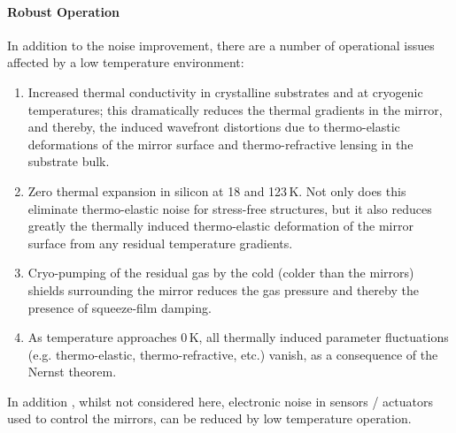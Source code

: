 \paragraph{Robust Operation}
In addition to the noise improvement, there are a number of operational issues affected by a low temperature environment:
\begin{enumerate}
\item Increased thermal conductivity in crystalline substrates and at cryogenic temperatures; this dramatically reduces the thermal gradients in the mirror, and thereby, the induced wavefront distortions due to thermo-elastic deformations of the mirror surface and thermo-refractive lensing in the substrate bulk.
\item Zero thermal expansion in silicon at 18 and 123\,K. Not only does this eliminate thermo-elastic noise for stress-free structures, but it also reduces greatly the thermally induced thermo-elastic deformation of the mirror surface from any residual temperature gradients.
\item Cryo-pumping of the residual gas by the cold (colder than the mirrors) shields surrounding the mirror reduces the gas pressure and thereby the presence of squeeze-film damping.


\item As temperature approaches 0\,K, all thermally induced parameter fluctuations (e.g. thermo-elastic, thermo-refractive, etc.) vanish, as a consequence of the Nernst theorem.
\end{enumerate}
In addition , whilst not considered here,   electronic noise in sensors / actuators used to control the mirrors, can be reduced by low temperature operation. 


